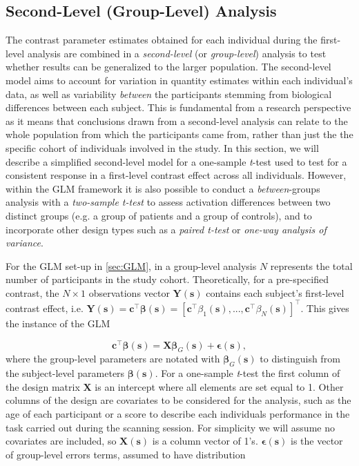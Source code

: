 \subsection{Second-Level (Group-Level) Analysis}

The contrast parameter estimates obtained for each individual during the first-level analysis are combined in a \textit{second-level} (or \textit{group-level}) analysis to test whether results can be generalized to the larger population. The second-level model aims to account for variation in quantity estimates within each individual's data, as well as variability \textit{between} the participants stemming from biological differences between each subject.  This is fundamental from a research perspective as it means that conclusions drawn from a second-level analysis can relate to the whole population from which the participants came from, rather than just the the specific cohort of individuals involved in the study. In this section, we will describe a simplified second-level model for a one-sample \textit{t}-test used to test for a consistent response in a first-level contrast effect across all individuals. However, within the GLM framework it is also possible to conduct a \textit{between}-groups analysis with a \textit{two-sample t-test} to assess activation differences between two distinct groups (e.g. a group of patients and a group of controls), and to incorporate other design types such as a \textit{paired t-test} or \textit{one-way analysis of variance}.   

For the GLM set-up in \ref{sec:GLM}, in a group-level analysis $N$ represents the total number of participants in the study cohort. Theoretically, for a pre-specified contrast, the $N \times 1$ observations vector $\bm{Y}(\bm{s})$ contains each subject's first-level contrast effect, i.e. $\bm{Y}(\bm{s}) = \bm{c}^{\intercal}\bm{\beta}(\bm{s}) = [\bm{c}^{\intercal}\beta_{1}(\bm{s}), ..., \bm{c}^{\intercal}\beta_{N}(\bm{s})]^{\intercal}$. This gives the instance of the GLM 

\begin{equation}
\label{eq:theoretical_group_GLM}
\bm{c}^{\intercal}\bm{\beta}(\bm{s}) = \bm{X}\bm{\beta}_{G}(\bm{s}) + \bm{\epsilon}(\bm{s}),
\end{equation}
where the group-level parameters are notated with $\bm{\beta}_{G}(\bm{s})$ to distinguish from the subject-level parameters $\bm{\beta}(\bm{s})$. For a one-sample \textit{t}-test the first column of the design matrix $\bm{X}$ is an intercept where all elements are set equal to 1. Other columns of the design are covariates to be considered for the analysis, such as the age of each participant or a score to describe each individuals performance in the task carried out during the scanning session. For simplicity we will assume no covariates are included, so $\bm{X}(\bm{s})$ is a column vector of 1's. $\bm{\epsilon}(\bm{s})$ is the vector of group-level errors terms, assumed to have distribution

